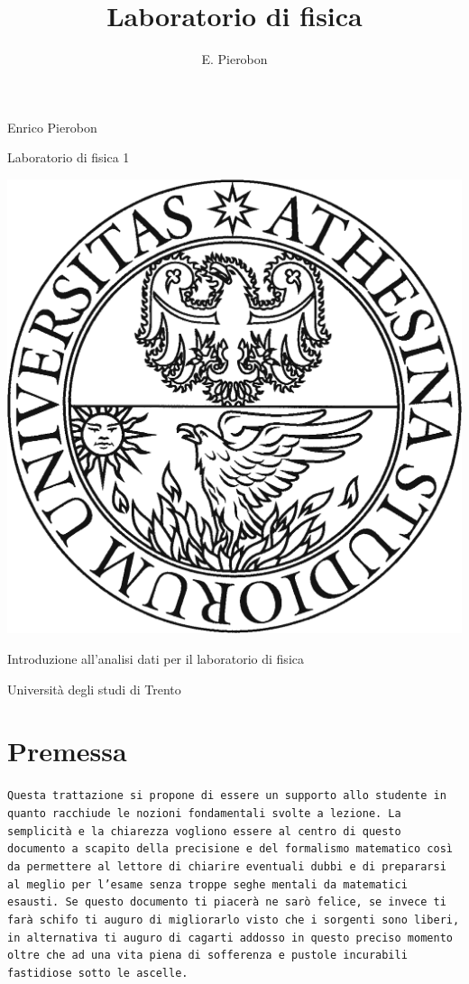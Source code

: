 \documentclass[11pt,a4paper]{book}
\author{E. Pierobon}
\title{Laboratorio di fisica}
\begin{document}
\frontmatter
\begin{titlepage}
\centering
{\large Enrico Pierobon \par}
{\Huge Laboratorio di fisica 1\par}
\includegraphics[width=\columnwidth]{./UniversitaDiTrento}
\vspace{24pt}
{\huge Introduzione all'analisi dati per il laboratorio di fisica\par}
{\small Università degli studi di Trento \par}
\end{titlepage}

\section*{Premessa}
\begin{center}
\texttt{Questa trattazione si propone di essere un supporto allo studente in quanto racchiude le nozioni fondamentali svolte a lezione. La semplicità e la chiarezza vogliono essere al centro di questo documento a scapito della precisione e del formalismo matematico così da permettere al lettore di chiarire eventuali dubbi e di prepararsi al meglio per l'esame senza troppe seghe mentali da matematici esausti. Se questo documento ti piacerà ne sarò felice, se invece ti farà schifo ti auguro di migliorarlo visto che i sorgenti sono liberi, in alternativa ti auguro di cagarti addosso in questo preciso momento oltre che ad una vita piena di sofferenza e pustole incurabili fastidiose sotto le ascelle.}
\end{center}
\tableofcontents
\mainmatter
\end{document}
